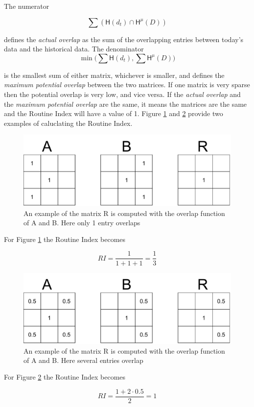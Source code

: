 The numerator 

\begin{equation}
\label{eq:feature-routine-index-numerator}
\sum (\mathsf{H}(d_t) \cap \mathsf{H}^{\mu} (D) )
\end{equation}

defines the \textit{actual overlap} as the sum of the overlapping entries between today's data and the historical data. The denominator 
\begin{equation}
\label{eq:feature-routine-index-denominator}
\min \Big(\sum \mathsf{H}(d_t), \sum \mathsf{H}^{\mu} (D) \Big)
\end{equation}

is the smallest sum of either matrix, whichever is smaller, and defines the \textit{maximum potential overlap} between the two matrices. If one matrix is very sparse then the potential overlap is very low, and vice versa. If the \textit{actual overlap} and the \textit{maximum potential overlap} are the same, it means the matrices are the same and the Routine Index will have a value of 1. Figure \ref{fig:routine-matrix-1} and \ref{fig:routine-matrix-2} provide two examples of caluclating the Routine Index.

\begin{figure}
    \centering
    \includegraphics[width=\textwidth]{images/routine-numbers-1.pdf}
    \caption{An example of the matrix R is computed with the overlap function of A and B. Here only 1 entry overlaps}
    \label{fig:routine-matrix-1}
\end{figure}

For Figure \ref{fig:routine-matrix-1} the Routine Index becomes 

\begin{equation}
RI = \frac{1}{1 + 1 + 1} = \frac{1}{3}
\end{equation}

\begin{figure}
    \centering
    \includegraphics[width=\textwidth]{images/routine-numbers-2.pdf}
        \caption{An example of the matrix R is computed with the overlap function of A and B. Here several entries overlap}
    \label{fig:routine-matrix-2}
\end{figure}

For Figure \ref{fig:routine-matrix-2} the Routine Index becomes

\begin{equation}
RI = \frac{1 + 2\cdot 0.5}{2} = 1
\end{equation}

